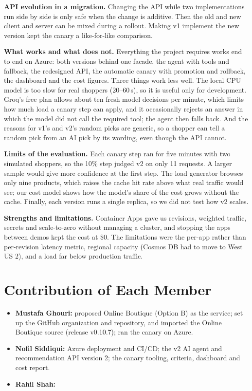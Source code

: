 \documentclass[conference]{IEEEtran}
\begin{document}
\textbf{API evolution in a migration.} Changing the API while two
implementations run side by side is only safe when the change is additive.
Then the old and new client and server can be mixed during a rollout. Making
v1 implement the new version kept the canary a like-for-like comparison.

\textbf{What works and what does not.} Everything the project requires
works end to end on Azure: both versions behind one facade, the agent with
tools and fallback, the redesigned API, the automatic canary with promotion
and rollback, the dashboard and the cost figures. Three things work less
well. The local CPU model is too slow for real shoppers (20--60\,s), so it
is useful only for development. Groq's free plan allows about ten fresh
model decisions per minute, which limits how much load a canary step can
apply, and it occasionally rejects an answer in which the model did not
call the required tool; the agent then falls back. And the reasons for
v1's and v2's random picks are generic, so a
shopper can tell a random pick from an AI pick by its wording, even though
the API cannot.

\textbf{Limits of the evaluation.} Each canary step ran for five minutes
with two simulated shoppers, so the 10\% step judged v2 on only 11
requests. A larger sample would give more confidence at the first step. The
load generator browses only nine products, which raises the cache hit rate
above what real traffic would see; our cost model shows how the model's
share of the cost grows without the cache. Finally, each version runs a
single replica, so we did not test how v2 scales.

\textbf{Strengths and limitations.} Container Apps gave us revisions,
weighted traffic, secrets and scale-to-zero without managing a cluster, and
stopping the apps between demos kept the cost at \$0. The limitations were
the per-app rather than per-revision latency metric, regional capacity
(Cosmos DB had to move to West US 2), and a load far below production
traffic.

\section{Contribution of Each Member}
\begin{itemize}
\item \textbf{Mustafa Ghouri:} proposed Online Boutique (Option B) as the
service; set up the GitHub organization and repository, and imported the
Online Boutique source (release v0.10.7); ran the canary on Azure.
\item \textbf{Nofil Siddiqui:} Azure deployment and CI/CD; the v2 AI agent
and recommendation API version 2; the canary tooling, criteria, dashboard
and cost report.
\item \textbf{Rahil Shah:}
\end{itemize}
\end{document}

